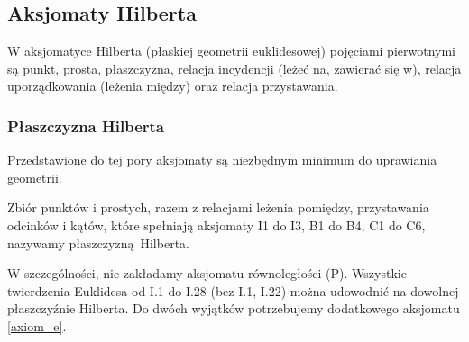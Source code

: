 %

\subsection{Aksjomaty Hilberta}
W aksjomatyce Hilberta (płaskiej geometrii euklidesowej) pojęciami pierwotnymi są punkt, prosta, płaszczyzna, relacja incydencji (leżeć na, zawierać się w), relacja uporządkowania (leżenia między) oraz relacja przystawania.






\subsubsection{Płaszczyzna Hilberta}

Przedstawione do tej pory aksjomaty są niezbędnym minimum do uprawiania geometrii.

\begin{definition}
    Zbiór punktów i prostych, razem z relacjami leżenia pomiędzy, przystawania odcinków i kątów, które spełniają aksjomaty I1 do I3, B1 do B4, C1 do C6, nazywamy płaszczyzną Hilberta.
\end{definition}

W szczególności, nie zakładamy aksjomatu równoległości (P).
Wszystkie twierdzenia Euklidesa od I.1 do I.28 (bez I.1, I.22) można udowodnić na dowolnej płaszczyźnie Hilberta.
Do dwóch wyjątków potrzebujemy dodatkowego aksjomatu \ref{axiom_e}.

%